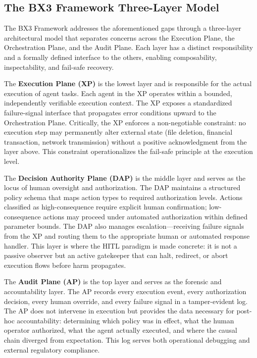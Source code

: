 \subsection{The BX3 Framework Three-Layer Model}

The BX3 Framework \cite{bansal2019} addresses the aforementioned gaps through a three-layer architectural model that separates concerns across the Execution Plane, the Orchestration Plane, and the Audit Plane. Each layer has a distinct responsibility and a formally defined interface to the others, enabling composability, inspectability, and fail-safe recovery.

The \textbf{Execution Plane (XP)} is the lowest layer and is responsible for the actual execution of agent tasks. Each agent in the XP operates within a bounded, independently verifiable execution context. The XP exposes a standardized failure-signal interface that propagates error conditions upward to the Orchestration Plane. Critically, the XP enforces a non-negotiable constraint: no execution step may permanently alter external state (file deletion, financial transaction, network transmission) without a positive acknowledgment from the layer above. This constraint operationalizes the fail-safe principle at the execution level.

The \textbf{Decision Authority Plane (DAP)} is the middle layer and serves as the locus of human oversight and authorization. The DAP maintains a structured policy schema that maps action types to required authorization levels. Actions classified as high-consequence require explicit human confirmation; low-consequence actions may proceed under automated authorization within defined parameter bounds. The DAP also manages escalation—receiving failure signals from the XP and routing them to the appropriate human or automated response handler. This layer is where the HITL paradigm is made concrete: it is not a passive observer but an active gatekeeper that can halt, redirect, or abort execution flows before harm propagates.

The \textbf{Audit Plane (AP)} is the top layer and serves as the forensic and accountability layer. The AP records every execution event, every authorization decision, every human override, and every failure signal in a tamper-evident log. The AP does not intervene in execution but provides the data necessary for post-hoc accountability: determining which policy was in effect, what the human operator authorized, what the agent actually executed, and where the causal chain diverged from expectation. This log serves both operational debugging and external regulatory compliance.

